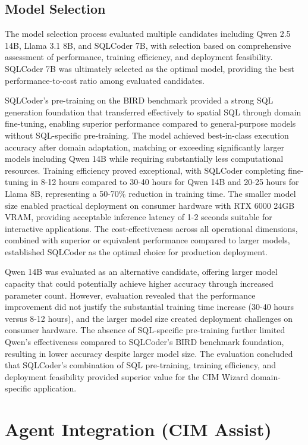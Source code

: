 \subsection{Model Selection}

The model selection process evaluated multiple candidates including Qwen 2.5 14B, Llama 3.1 8B, and SQLCoder 7B, with selection based on comprehensive assessment of performance, training efficiency, and deployment feasibility. SQLCoder 7B was ultimately selected as the optimal model, providing the best performance-to-cost ratio among evaluated candidates.

SQLCoder's pre-training on the BIRD benchmark provided a strong SQL generation foundation that transferred effectively to spatial SQL through domain fine-tuning, enabling superior performance compared to general-purpose models without SQL-specific pre-training. The model achieved best-in-class execution accuracy after domain adaptation, matching or exceeding significantly larger models including Qwen 14B while requiring substantially less computational resources. Training efficiency proved exceptional, with SQLCoder completing fine-tuning in 8-12 hours compared to 30-40 hours for Qwen 14B and 20-25 hours for Llama 8B, representing a 50-70\% reduction in training time. The smaller model size enabled practical deployment on consumer hardware with RTX 6000 24GB VRAM, providing acceptable inference latency of 1-2 seconds suitable for interactive applications. The cost-effectiveness across all operational dimensions, combined with superior or equivalent performance compared to larger models, established SQLCoder as the optimal choice for production deployment.

Qwen 14B was evaluated as an alternative candidate, offering larger model capacity that could potentially achieve higher accuracy through increased parameter count. However, evaluation revealed that the performance improvement did not justify the substantial training time increase (30-40 hours versus 8-12 hours), and the larger model size created deployment challenges on consumer hardware. The absence of SQL-specific pre-training further limited Qwen's effectiveness compared to SQLCoder's BIRD benchmark foundation, resulting in lower accuracy despite larger model size. The evaluation concluded that SQLCoder's combination of SQL pre-training, training efficiency, and deployment feasibility provided superior value for the CIM Wizard domain-specific application.

\section{Agent Integration (CIM Assist)}

